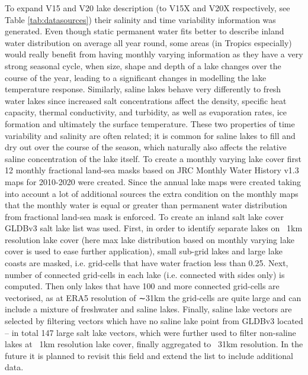 \documentclass[hess, twostagejnl]{copernicus}
\begin{document}
To expand V15 and V20 lake description (to V15X and V20X respectively, see Table \ref{tab:datasources}) their salinity and time variability information was generated. Even though static permanent water fits better to describe inland water distribution on average all year round, some areas (in Tropics especially) would really benefit from having monthly varying information as they have a very strong seasonal cycle, when size, shape and depth of a lake changes over the course of the year, leading to a significant changes in modelling the lake temperature response. Similarly, saline lakes behave very differently to fresh water lakes since increased salt concentrations affect the density, specific heat capacity, thermal conductivity, and turbidity, as well as evaporation rates, ice formation and ultimately the surface temperature. These two properties of time variability and salinity are often related; it is common for saline lakes to fill and dry out over the course of the season, which naturally also affects the relative saline concentration of the lake itself. To create a monthly varying lake cover first 12 monthly fractional land-sea masks based on JRC Monthly Water History v1.3 maps for 2010-2020 were created. Since the annual lake maps were created taking into account a lot of additional sources the extra condition on the monthly maps that the monthly water is equal or greater than permanent water distribution from fractional land-sea mask is enforced. To create an inland salt lake cover GLDBv3 salt lake list was used. First, in order to identify separate lakes on ~1km resolution lake cover (here max lake distribution based on monthly varying lake cover is used to ease further application), small sub-grid lakes and large lake coasts are masked, i.e. grid-cells that have water fraction less than 0.25. Next, number of connected grid-cells in each lake (i.e. connected with sides only) is computed. Then only lakes that have 100 and more connected grid-cells are vectorised, as at ERA5 resolution of ∼31km the grid-cells are quite large and can include a mixture of freshwater and saline lakes. Finally, saline lake vectors are selected by filtering vectors which have no saline lake point from GLDBv3 located – in total 147 large salt lake vectors, which were further used to filter non-saline lakes at ~1km resolution lake cover, finally aggregated to ~31km resolution. In the future it is planned to revisit this field and extend the list to include additional data.
\end{document}
